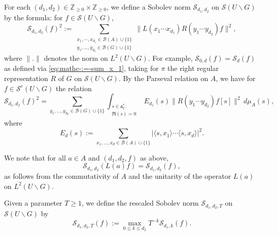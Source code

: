 For each $(d_1,d_2) \in \mathbb{Z}_{\geq 0} \times \mathbb{Z}_{\geq 0}$, we define a Sobolev norm $\mathcal{S}_{d_1,d_2}$ on $\mathcal{S}(U \backslash G)$ by the formula: for $f \in \mathcal{S}(U \backslash G)$,  
\begin{equation*}
  \mathcal{S}_{d_1,d_2}(f)^2 :=
  \sum_{
    \substack{
      x_1, \dotsb, x_{d_1} \in \mathcal{B}(A) \cup \{1\}  \\
      y_1, \dotsc, y_{d_2 } \in \mathcal{B}(G) \cup \{1\}
    }
  }
  \| L(x_1 \dotsb x_{d_1}) R(y_1 \dotsb y_{d_2}) f \|^2,
\end{equation*}
where $\|.\|$ denotes the norm on $L^2(U \backslash G)$.  For example, $\mathcal{S}_{0,d}(f) = \mathcal{S}_{d}(f)$ as defined via \eqref{eq:mathc-:=-sum_x_1}, taking for $\pi$ the right regular representation $R$ of $G$ on $\mathcal{S}(U \backslash G)$.  By the Parseval relation on $A$, we have for $f \in \mathcal{S}^e(U \backslash G)$ the relation
\begin{equation}\label{eq:sobolev-parseval-A-U-G}
  \mathcal{S}_{d_1,d_2}(f)^2 =
  \sum_{
    y_1, \dotsc, y_{d_2 } \in \mathcal{B}(G) \cup \{1\}
  }
  \int_{
    \substack{
      s \in \mathfrak{a}_{\mathbb{C}}^* :  \\
      \Re(s) = 0
    }
  }
  E_{d_1}(s)
  \| R(y_1 \dotsb y_{d_2}) f[s] \|^2 \, d \mu_A(s),
\end{equation}
where
\begin{equation}\label{eq:e_ds-:=-sum}
  E_d(s) :=
  \sum_{
    x_1, \dotsc, x_{d } \in \mathcal{B}(A) \cup \{1\}
  }
  \left\lvert \langle s, x_1 \rangle \dotsb \langle s, x_d \rangle \right\rvert^2.
\end{equation}

We note that for all $a \in A$ and $(d_1,d_2,f)$ as above,
\begin{equation}\label{eq:mathcals_d_1-d_2la-f}
  \mathcal{S}_{d_1,d_2}(L(a) f) = \mathcal{S}_{d_1,d_2}(f),
\end{equation}
as follows from the commutativity of $A$ and the unitarity of the operator $L(a)$ on $L^2(U \backslash G)$.


Given a parameter $T \geq 1$, we define the rescaled Sobolev norm $\mathcal{S}_{d_1,d_2,T}$ on $\mathcal{S}(U \backslash G)$ by 
\begin{equation}\label{eq:mathcals_d_1-d_2-tf}
  \mathcal{S}_{d_1,d_2,T}(f) :=
  \max_{0 \leq k \leq d_2}
  T^{-k}
  \mathcal{S}_{d_1,k}(f).
\end{equation}

